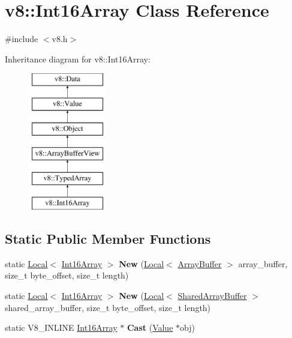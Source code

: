 \hypertarget{classv8_1_1Int16Array}{}\section{v8\+:\+:Int16\+Array Class Reference}
\label{classv8_1_1Int16Array}


{\ttfamily \#include $<$v8.\+h$>$}

Inheritance diagram for v8\+:\+:Int16\+Array\+:\begin{figure}[H]
\begin{center}
\leavevmode
\includegraphics[height=6.000000cm]{classv8_1_1Int16Array}
\end{center}
\end{figure}
\subsection*{Static Public Member Functions}
\begin{DoxyCompactItemize}
\item 
\mbox{\label{classv8_1_1Int16Array_a6e102d644c3f96345bcf212673b96090}} 
static \mbox{\hyperlink{classv8_1_1Local}{Local}}$<$ \mbox{\hyperlink{classv8_1_1Int16Array}{Int16\+Array}} $>$ {\bfseries New} (\mbox{\hyperlink{classv8_1_1Local}{Local}}$<$ \mbox{\hyperlink{classv8_1_1ArrayBuffer}{Array\+Buffer}} $>$ array\+\_\+buffer, size\+\_\+t byte\+\_\+offset, size\+\_\+t length)
\item 
\mbox{\label{classv8_1_1Int16Array_a9634021f52042c976091549358731432}} 
static \mbox{\hyperlink{classv8_1_1Local}{Local}}$<$ \mbox{\hyperlink{classv8_1_1Int16Array}{Int16\+Array}} $>$ {\bfseries New} (\mbox{\hyperlink{classv8_1_1Local}{Local}}$<$ \mbox{\hyperlink{classv8_1_1SharedArrayBuffer}{Shared\+Array\+Buffer}} $>$ shared\+\_\+array\+\_\+buffer, size\+\_\+t byte\+\_\+offset, size\+\_\+t length)
\item 
\mbox{\label{classv8_1_1Int16Array_abef12f11ace9c74a4ce451db28b954e5}} 
static V8\+\_\+\+I\+N\+L\+I\+NE \mbox{\hyperlink{classv8_1_1Int16Array}{Int16\+Array}} $\ast$ {\bfseries Cast} (\mbox{\hyperlink{classv8_1_1Value}{Value}} $\ast$obj)
\end{DoxyCompactItemize}
